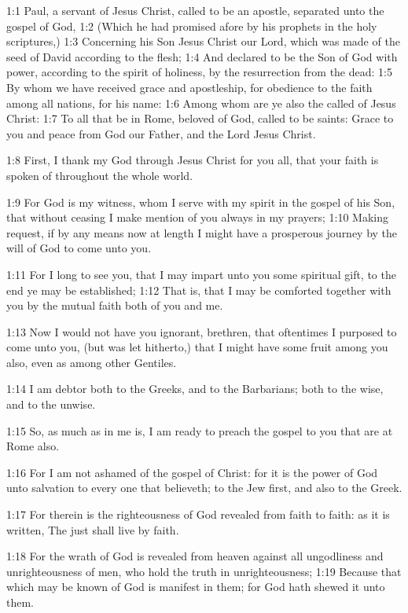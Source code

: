 

1:1 Paul, a servant of Jesus Christ, called to be an apostle,
separated unto the gospel of God, 1:2 (Which he had promised afore by
his prophets in the holy scriptures,) 1:3 Concerning his Son Jesus
Christ our Lord, which was made of the seed of David according to the
flesh; 1:4 And declared to be the Son of God with power, according to
the spirit of holiness, by the resurrection from the dead: 1:5 By whom
we have received grace and apostleship, for obedience to the faith
among all nations, for his name: 1:6 Among whom are ye also the called
of Jesus Christ: 1:7 To all that be in Rome, beloved of God, called to
be saints: Grace to you and peace from God our Father, and the Lord
Jesus Christ.

1:8 First, I thank my God through Jesus Christ for you all, that your
faith is spoken of throughout the whole world.

1:9 For God is my witness, whom I serve with my spirit in the gospel
of his Son, that without ceasing I make mention of you always in my
prayers; 1:10 Making request, if by any means now at length I might
have a prosperous journey by the will of God to come unto you.

1:11 For I long to see you, that I may impart unto you some spiritual
gift, to the end ye may be established; 1:12 That is, that I may be
comforted together with you by the mutual faith both of you and me.

1:13 Now I would not have you ignorant, brethren, that oftentimes I
purposed to come unto you, (but was let hitherto,) that I might have
some fruit among you also, even as among other Gentiles.

1:14 I am debtor both to the Greeks, and to the Barbarians; both to
the wise, and to the unwise.

1:15 So, as much as in me is, I am ready to preach the gospel to you
that are at Rome also.

1:16 For I am not ashamed of the gospel of Christ: for it is the power
of God unto salvation to every one that believeth; to the Jew first,
and also to the Greek.

1:17 For therein is the righteousness of God revealed from faith to
faith: as it is written, The just shall live by faith.

1:18 For the wrath of God is revealed from heaven against all
ungodliness and unrighteousness of men, who hold the truth in
unrighteousness; 1:19 Because that which may be known of God is
manifest in them; for God hath shewed it unto them.

